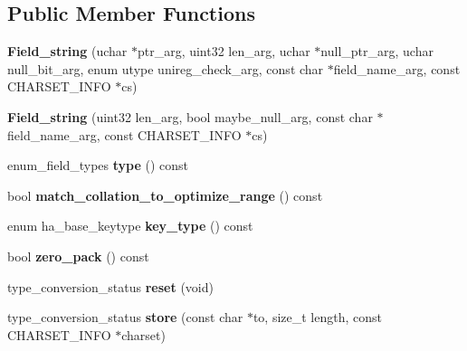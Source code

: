 \subsection*{Public Member Functions}
\begin{DoxyCompactItemize}
\item 
\mbox{\label{classField__string_ad1b5794f1a3885c64daa685bb8257b86}} 
{\bfseries Field\+\_\+string} (uchar $\ast$ptr\+\_\+arg, uint32 len\+\_\+arg, uchar $\ast$null\+\_\+ptr\+\_\+arg, uchar null\+\_\+bit\+\_\+arg, enum utype unireg\+\_\+check\+\_\+arg, const char $\ast$field\+\_\+name\+\_\+arg, const C\+H\+A\+R\+S\+E\+T\+\_\+\+I\+N\+FO $\ast$cs)
\item 
\mbox{\label{classField__string_ae4415915f710b707bf8c4e925086aeb5}} 
{\bfseries Field\+\_\+string} (uint32 len\+\_\+arg, bool maybe\+\_\+null\+\_\+arg, const char $\ast$field\+\_\+name\+\_\+arg, const C\+H\+A\+R\+S\+E\+T\+\_\+\+I\+N\+FO $\ast$cs)
\item 
\mbox{\label{classField__string_aaa008612d778979434eb916848358524}} 
enum\+\_\+field\+\_\+types {\bfseries type} () const
\item 
\mbox{\label{classField__string_a7399f99754c73b30c85f67de281dfe85}} 
bool {\bfseries match\+\_\+collation\+\_\+to\+\_\+optimize\+\_\+range} () const
\item 
\mbox{\label{classField__string_a799ed31adf2d1e5c9dc320fc2e16a43b}} 
enum ha\+\_\+base\+\_\+keytype {\bfseries key\+\_\+type} () const
\item 
\mbox{\label{classField__string_adf0eee2d19e4c68edcb9451e4fd620bc}} 
bool {\bfseries zero\+\_\+pack} () const
\item 
\mbox{\label{classField__string_a0f49e6aad46aaf8a846264f458ed9548}} 
type\+\_\+conversion\+\_\+status {\bfseries reset} (void)
\item 
\mbox{\label{classField__string_ac1cf40598a1ca888b7450add9b7093fd}} 
type\+\_\+conversion\+\_\+status {\bfseries store} (const char $\ast$to, size\+\_\+t length, const C\+H\+A\+R\+S\+E\+T\+\_\+\+I\+N\+FO $\ast$charset)

\end{DoxyCompactItemize}
